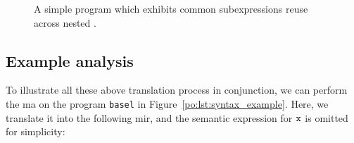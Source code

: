 \begin{figure}[ht]
{\label{po:fig:mir_fix_external_2}
    }
    \caption{%
        A simple program which exhibits common subexpressions reuse across
        nested .
    }
\end{figure}


\subsection{Example analysis}

To illustrate all these above translation process in conjunction,
we can perform the \gls{ma} on the program \verb|basel| in
Figure~\ref{po:lst:syntax_example}.  Here, we translate it into the following
\gls{mir}, and the semantic expression for $\texttt{x}$ is omitted for simplicity:

